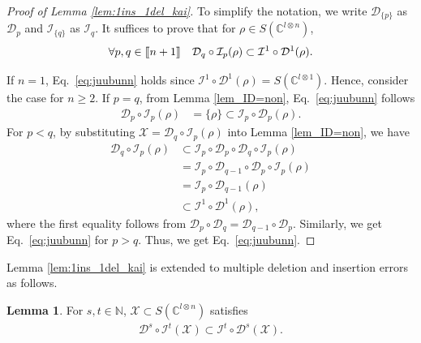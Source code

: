 \documentclass[reprint,amsmath,amssymb,aps,]{revtex4-2}
\theoremstyle{definition}
\newtheorem{lem}{Lemma}
\newcommand{\SET}[1]{\mathbb{#1}}
\newcommand{\N}{\SET{N}}
\newcommand{\C}{\SET{C}}
\newcommand{\1}{\mbox{1}\hspace{-0.25em}\mbox{l}}%
\newcommand{\setint}[1]{[\hspace{-0.5mm}[#1]\hspace{-0.5mm}]}
\newcommand{\pure}[2]{\C^{#1 \otimes #2}}
\newcommand{\state}[2]{S(\pure{#1}{#2})}
\newcommand{\QU}[1]{\mathcal{#1}}
\begin{document}
\begin{proof}[Proof of Lemma \ref{lem:1ins_1del_kai}]
  To simplify the notation,
  we write $\QU{D}_{\{ p \}}$ as $\QU{D}_p$
  and
  $\QU{I}_{\{ q \}}$ as $\QU{I}_q$.
  It suffices to prove that
  for $\rho \in \state{l}{n}$,
  \begin{align}
    \forall
    p,q \in \setint{n+1}
    ~~~
    \QU{D}_q \circ \QU{I}_p( \rho )
    \subset
    \QU{I}^1 \circ \QU{D}^1( \rho ).
    \label{eq:juubunn}    
  \end{align}
  
  If $n = 1$,
  Eq.~\eqref{eq:juubunn} holds
  since
  $\QU{I}^1 \circ \QU{D}^1( \rho ) = \state{l}{1}$.
  Hence,
  consider the case for $n \ge 2$.
  If $p = q$,
  from Lemma \ref{lem_ID=non},
  Eq.~\eqref{eq:juubunn} follows
  \begin{align*}
    \QU{D}_p \circ \QU{I}_p( \rho )
    &=
    \{ \rho \}
    \subset
    \QU{I}_p \circ \QU{D}_p( \rho ). 
  \end{align*}
  For $p < q$,
  by substituting $\QU{X} = \QU{D}_q \circ \QU{I}_p( \rho )$ into Lemma \ref{lem_ID=non},
  we have 
  \begin{align*}
    \QU{D}_q \circ \QU{I}_p( \rho )
    &\subset
    \QU{I}_p \circ \QU{D}_p \circ \QU{D}_q \circ \QU{I}_p( \rho )\\
    &=
    \QU{I}_p \circ \QU{D}_{q-1} \circ \QU{D}_p \circ \QU{I}_p( \rho )\\
    &=
    \QU{I}_p \circ \QU{D}_{q-1}( \rho )\\
    &\subset
    \QU{I}^1 \circ \QU{D}^1( \rho ),
  \end{align*}
  where
  the first equality
  follows
  from $\QU{D}_p \circ \QU{D}_q = \QU{D}_{q-1} \circ \QU{D}_p$.
  Similarly,
  we get Eq.~\eqref{eq:juubunn}
  for $p > q$.
  Thus,
  we get Eq.~\eqref{eq:juubunn}.
\end{proof}

Lemma \ref{lem:1ins_1del_kai} is extended
to multiple deletion and insertion errors as follows.

\begin{lem}
  \label{lem:swap_TinsTdel_kai}
  For $s, t \in \N$,
  $\QU{X} \subset \state{l}{n}$ satisfies
  \begin{align*}
    \QU{D}^s \circ \QU{I}^t(\QU{X})
    \subset
    \QU{I}^t \circ \QU{D}^s(\QU{X}).
  \end{align*}
\end{lem}
\end{document}
